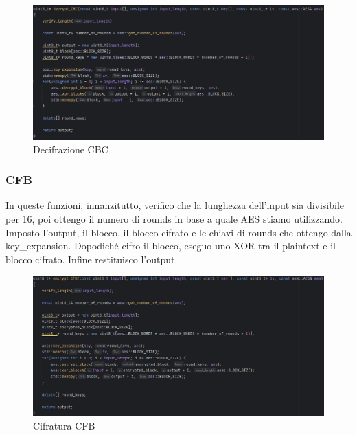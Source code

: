 
\begin{figure}[H]
	\centering
	\includegraphics[width=1\textwidth, height=1\textheight, keepaspectratio]{./images/code/cpp/modes/decrypt_CBC.PNG}
	\caption{Decifrazione CBC}
	\label{fig:decrypt_CBC}
\end{figure}

\subsubsection{CFB}

     

\textsf{\small In queste funzioni, innanzitutto, verifico che la lunghezza dell'input sia divisibile per 16, poi ottengo il numero di rounds in base a quale AES stiamo utilizzando. Imposto l'output, il blocco, il blocco cifrato e le chiavi di rounds che ottengo dalla key\_expansion. Dopodiché cifro il blocco, eseguo uno XOR tra il plaintext e il blocco cifrato. Infine restituisco l'output.}

\begin{figure}[H]
	\centering
	\includegraphics[width=1\textwidth, height=1\textheight, keepaspectratio]{./images/code/cpp/modes/encrypt_CFB.PNG}
	\caption{Cifratura CFB}
	\label{fig:encrypt_CFB}
\end{figure}

